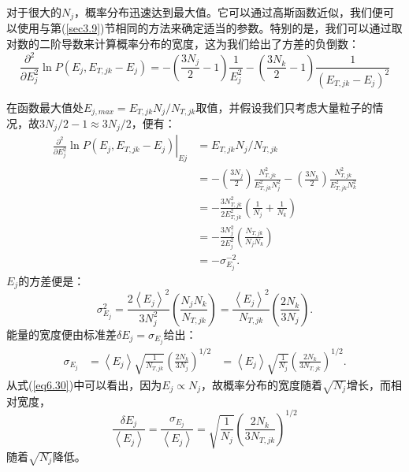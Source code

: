 \documentclass[UTF8]{ctexart}
\numberwithin{equation}{section}%
\numberwithin{figure}{section}%
\begin{document}
    对于很大的$N_j$，概率分布迅速达到最大值。它可以通过高斯函数近似，我们便可以使用与第(\ref{sec3.9})节相同的方法来确定适当的参数。特别的是，我们可以通过取对数的二阶导数来计算概率分布的宽度，这为我们给出了方差的负倒数：
    \begin{equation}
        \frac{\partial^{2}}{\partial E_{j}^{2}} \ln P\left(E_{j}, E_{T, j k}-E_{j}\right)=-\left(\frac{3 N_{j}}{2}-1\right) \frac{1}{E_{j}^{2}}-\left(\frac{3 N_{k}}{2}-1\right) \frac{1}{\left(E_{T, j k}-E_{j}\right)^{2}}
    \end{equation}

    在函数最大值处$E_{j,max}=E_{T,jk}N_j/N_{T,jk}$取值，并假设我们只考虑大量粒子的情况，故$3N_j/2-1\approx 3N_j/2$，便有：
    \begin{equation}
        \begin{aligned}
            \left.\frac{\partial^{2}}{\partial E_{j}^{2}} \ln P\left(E_{j}, E_{T, j k}-E_{j}\right)\right|_{E j} &=E_{T, j k} N_{j} / N_{T, j k} \\
            &=-\left(\frac{3 N_{j}}{2}\right) \frac{N_{T, j k}^{2}}{E_{T, j k}^{2} N_{j}^{2}}-\left(\frac{3 N_{k}}{2}\right) \frac{N_{T, j k}^{2}}{E_{T, j k}^{2} N_{k}^{2}} \\
            &=-\frac{3 N_{T, j k}^{2}}{2 E_{T, j k}^{2}}\left(\frac{1}{N_{j}}+\frac{1}{N_{k}}\right) \\
            &=-\frac{3 N_{j}^{2}}{2 E_{j}^{2}}\left(\frac{N_{T, j k}}{N_{j} N_{k}}\right) \\
            &=-\sigma_{E_{j}}^{-2} .
            \end{aligned}
    \end{equation}
    $E_j$的方差便是：
    \begin{equation}
    \sigma_{E_{j}}^{2}=\frac{2\left\langle E_{j}\right\rangle^{2}}{3 N_{j}^{2}}\left(\frac{N_{j} N_{k}}{N_{T, j k}}\right)=\frac{\left\langle E_{j}\right\rangle^{2}}{N_{T, j k}}\left(\frac{2 N_{k}}{3 N_{j}}\right) .
    \end{equation}
    能量的宽度便由标准差$\delta E_j=\sigma_{E_j}$给出：
    \begin{equation}\label{eq6.30}
        \begin{aligned}
        \sigma_{E_{j}}&=\left\langle E_{j}\right\rangle \sqrt{\frac{1}{N_{T, j k}}}\left(\frac{2 N_{k}}{3 N_{j}}\right)^{1 / 2}
        &=\left\langle E_{j}\right\rangle \sqrt{\frac{1}{N_{j}}}\left(\frac{2 N_{k}}{3 N_{T, j k}}\right)^{1 / 2} .
        \end{aligned}
    \end{equation}
    从式(\ref{eq6.30})中可以看出，因为$E_{j} \propto N_{j}$，故概率分布的宽度随着$\sqrt{N_j}$增长，而相对宽度，
    \begin{equation}
        \frac{\delta E_{j}}{\left\langle E_{j}\right\rangle}=\frac{\sigma_{E_{j}}}{\left\langle E_{j}\right\rangle}=\sqrt{\frac{1}{N_{j}}}\left(\frac{2 N_{k}}{3 N_{T, j k}}\right)^{1 / 2}
    \end{equation}
    随着$\sqrt{N_j}$降低。
\end{document}
